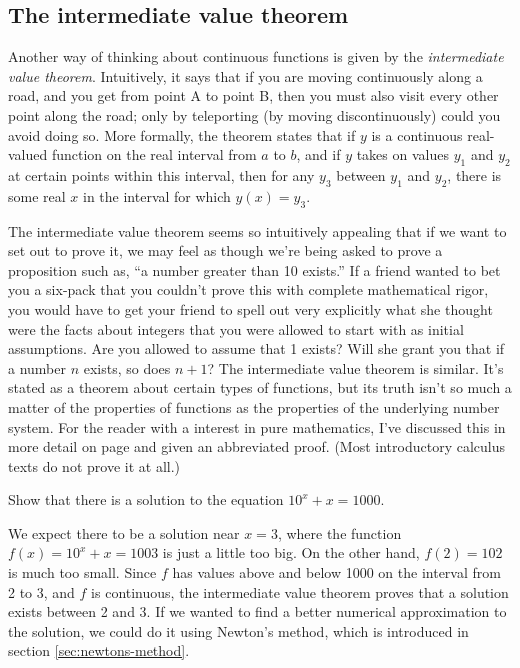 \subsection{The intermediate value theorem}

Another way of thinking about continuous functions is given by the
\emph{intermediate value theorem}.
Intuitively, it says that if you are moving continuously along a road, 
and you get from point A to point B, then you must also visit every other point
along the road; only by teleporting (by moving discontinuously) could you
avoid doing so. More formally, the theorem states
that if $y$ is a continuous real-valued function on the real interval from $a$ to $b$,
and if $y$ takes on values $y_1$ and $y_2$ at certain points within this interval, then for any $y_3$ between $y_1$ and
$y_2$, there is some real $x$ in the interval for which $y(x)=y_3$.


The intermediate value theorem seems so intuitively appealing that if we want to
set out to prove it, we may feel as though we're being asked to prove a proposition such as, ``a number greater than 10 exists.''
If a friend wanted to bet you a six-pack that you couldn't prove this with complete mathematical rigor, you would have to
get your friend to spell out very explicitly what she thought were the facts about
integers that you were allowed to start with as initial assumptions. Are you allowed to assume that 1 exists?
Will she grant you that if a number $n$ exists, so does $n+1$?
The intermediate value theorem is similar. It's stated as a theorem about certain types
of functions, but its truth isn't so much a matter of the properties of functions as
the properties of the underlying number system. For the reader with a interest in pure
mathematics, I've discussed this in more detail on page \pageref{detour:intermediate-value} and given
an abbreviated proof.\label{intermediate-value-ref-to-detour}
(Most introductory calculus texts do not prove it at all.)

\begin{eg}
\egquestion Show that there is a solution to the equation $10^x+x=1000$.

\eganswer We expect there to be a solution near $x=3$, where the function $f(x)=10^x+x=1003$ is just a little too big.
On the other hand, $f(2)=102$ is much too small. Since $f$ has values above and below 1000 on the interval from
2 to 3, and $f$ is continuous, the intermediate value theorem proves that a solution exists between 2 and 3.
If we wanted to find a better numerical approximation to the solution, we could do it using Newton's
method, which is introduced in section \ref{sec:newtons-method}.
\end{eg}


